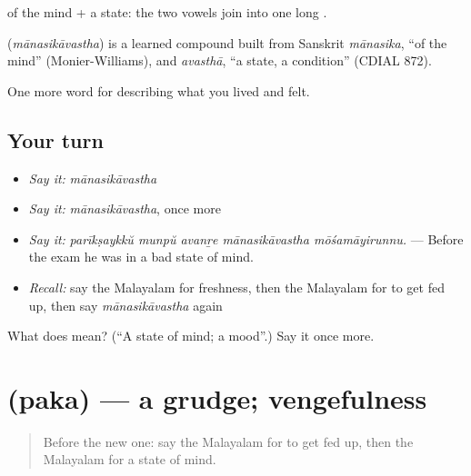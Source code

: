  of the mind +  a state: the two vowels join into one long .

\begin{cousinweb}
\textbf{} (\emph{mānasikāvastha}) is a learned compound built from Sanskrit \emph{mānasika}, \textquotedblleft{}of the mind\textquotedblright{} (Monier-Williams), and \emph{avasthā}, \textquotedblleft{}a state, a condition\textquotedblright{} (CDIAL 872).
\end{cousinweb}

\begin{grammarlens}[title={What you've built}]
One more word for describing what you lived and felt.
\end{grammarlens}

\subsection*{Your turn}
\begin{itemize}
\raggedright
  \item \emph{Say it:} \emph{mānasikāvastha}
  \item \emph{Say it:} \emph{mānasikāvastha}, once more
  \item \emph{Say it:} \emph{parīkṣaykkŭ munpŭ avanṟe mānasikāvastha mōśamāyirunnu.} — Before the exam he was in a bad state of mind.
  \item \emph{Recall:} say the Malayalam for freshness, then the Malayalam for to get fed up, then say \emph{mānasikāvastha} again
\end{itemize}

\begin{tcolorbox}[breakable,colback=teal!4,colframe=teal!35!black,title={Before you move on}]
What does  mean? (\textquotedblleft{}A state of mind; a mood\textquotedblright{}.) Say it once more.
\end{tcolorbox}
\section[\texorpdfstring{\ml{പക} (paka)}{പക (paka)}]{ (paka) — a grudge; vengefulness}

\label{lesson:ML-C523-paka}



\begin{quote}
Before the new one: say the Malayalam for to get fed up, then the Malayalam for a state of mind.
\end{quote}

